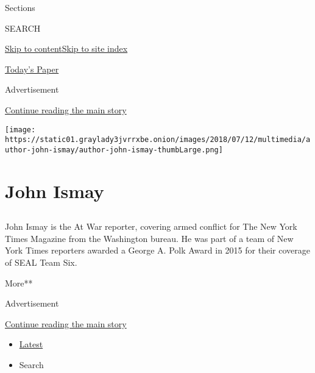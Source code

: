 Sections

SEARCH

\protect\hyperlink{site-content}{Skip to
content}\protect\hyperlink{site-index}{Skip to site index}

\href{https://myaccount.nytimes3xbfgragh.onion/auth/login?response_type=cookie\&client_id=vi}{}

\href{https://www.nytimes3xbfgragh.onion/section/todayspaper}{Today's
Paper}

Advertisement

\protect\hyperlink{after-top}{Continue reading the main story}

\texttt{[image: https://static01.graylady3jvrrxbe.onion/images/2018/07/12/multimedia/author-john-ismay/author-john-ismay-thumbLarge.png]}

\hypertarget{john-ismay}{%
\section{John Ismay}\label{john-ismay}}

\subsection{}

John Ismay is the At War reporter, covering armed conflict for The New
York Times Magazine from the Washington bureau. He was part of a team of
New York Times reporters awarded a George A. Polk Award in 2015 for
their coverage of SEAL Team Six.~

More**

Advertisement

\protect\hyperlink{after-mid1}{Continue reading the main story}

\begin{itemize}
\tightlist
\item
  \protect\hyperlink{stream-panel}{Latest}
\item
  Search
\end{itemize}

